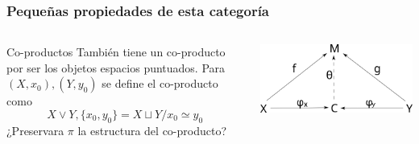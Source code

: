 \documentclass[xetex,mathserif,serif]{beamer}
\begin{document}
  \begin{frame}
    \frametitle{Pequeñas propiedades de esta categoría}
    \begin{columns}
      \begin{column}{0.6\textwidth}
        \begin{block}{Co-productos}
          También tiene un co-producto por ser los objetos espacios
          puntuados. Para \((X, x_0) , (Y, y_0)\) se define el
          co-producto como
          \[ X \vee Y , \{x_0, y_0\} = X \sqcup Y / x_0 \simeq y_0 \]
          ¿Preservara \(\pi\) la estructura del co-producto?
        \end{block}
      \end{column}
      \begin{column}{0.4\textwidth}
        \begin{center}
          \includegraphics[scale=0.32]{../tesis/imagenes/coproducto.png}
        \end{center}
      \end{column}
    \end{columns}
  \end{frame}
\end{document}
